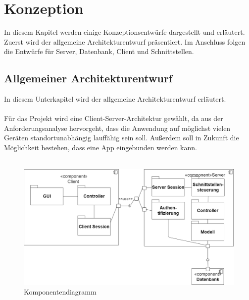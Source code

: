 \section{Konzeption}\label{konzeption}

In diesem Kapitel werden einige Konzeptionsentwürfe dargestellt und erläutert. 
Zuerst wird der allgemeine Architekturentwurf präsentiert. Im Anschluss folgen die Entwürfe für Server, Datenbank, Client und Schnittstellen.

\subsection{Allgemeiner Architekturentwurf}\label{allgemeiner_Architekturentwurf}

In diesem Unterkapitel wird der allgemeine Architekturentwurf erläutert.
\\
\\
Für das Projekt wird eine Client-Server-Architektur gewählt, da aus der Anforderungsanalyse hervorgeht, dass die Anwendung auf möglichst vielen Geräten standortunabhängig lauffähig sein soll. Außerdem soll in Zukunft die Möglichkeit bestehen, dass eine App eingebunden werden kann.
\\
\\

\begin{figure}[htb]
	\centering
	\includegraphics[width=1\textwidth,angle=0]{abb/Komponentendiagramm}
	\caption[Komponentendiagramm]{Komponentendiagramm}
	\label{fig:Komponentendiagramm}
\end{figure}

